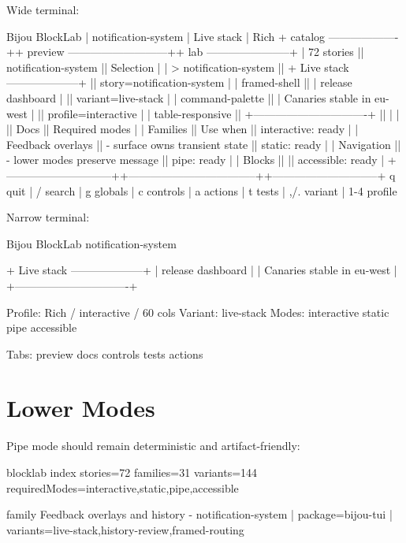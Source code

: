 Wide terminal:

\begin{CodeBlock}
Bijou BlockLab | notification-system | Live stack | Rich
+ catalog -------------------++ preview ---------------------------++ lab -----------------------+
| 72 stories                  || notification-system                || Selection                  |
| > notification-system       || + Live stack --------------------+ || story=notification-system  |
|   framed-shell              || | release dashboard              | || variant=live-stack        |
|   command-palette           || | Canaries stable in eu-west     | || profile=interactive       |
|   table-responsive          || +-------------------------------+ ||                              |
|                             || Docs                              || Required modes             |
| Families                    || Use when                          || interactive: ready         |
| Feedback overlays           || - surface owns transient state     || static: ready              |
| Navigation                  || - lower modes preserve message     || pipe: ready                |
| Blocks                      ||                                   || accessible: ready          |
+-----------------------------++-----------------------------------++-----------------------------+
q quit | / search | g globals | c controls | a actions | t tests | ,/. variant | 1-4 profile
\end{CodeBlock}

Narrow terminal:

\begin{CodeBlock}
Bijou BlockLab
notification-system

+ Live stack --------------------+
| release dashboard              |
| Canaries stable in eu-west     |
+-------------------------------+

Profile: Rich / interactive / 60 cols
Variant: live-stack
Modes: interactive static pipe accessible

Tabs: preview docs controls tests actions
\end{CodeBlock}

\section{Lower Modes}\label{record-134-lower-modes}

Pipe mode should remain deterministic and artifact-friendly:

\begin{CodeBlock}
blocklab index
stories=72
families=31
variants=144
requiredModes=interactive,static,pipe,accessible

family Feedback overlays and history
- notification-system | package=bijou-tui | variants=live-stack,history-review,framed-routing
\end{CodeBlock}

